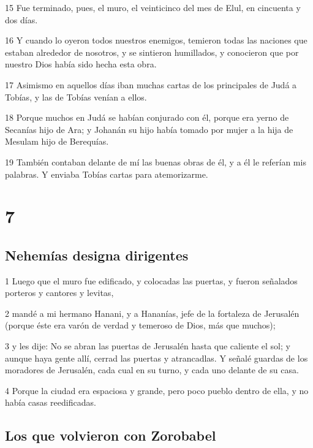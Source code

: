 \par 15 Fue terminado, pues, el muro, el veinticinco del mes de Elul, en cincuenta y dos días.
\par 16 Y cuando lo oyeron todos nuestros enemigos, temieron todas las naciones que estaban alrededor de nosotros, y se sintieron humillados, y conocieron que por nuestro Dios había sido hecha esta obra.
\par 17 Asimismo en aquellos días iban muchas cartas de los principales de Judá a Tobías, y las de Tobías venían a ellos.
\par 18 Porque muchos en Judá se habían conjurado con él, porque era yerno de Secanías hijo de Ara; y Johanán su hijo había tomado por mujer a la hija de Mesulam hijo de Berequías.
\par 19 También contaban delante de mí las buenas obras de él, y a él le referían mis palabras. Y enviaba Tobías cartas para atemorizarme.

\chapter{7}

\section*{Nehemías designa dirigentes}

\par 1 Luego que el muro fue edificado, y colocadas las puertas, y fueron señalados porteros y cantores y levitas,
\par 2 mandé a mi hermano Hanani, y a Hananías, jefe de la fortaleza de Jerusalén (porque éste era varón de verdad y temeroso de Dios, más que muchos);
\par 3 y les dije: No se abran las puertas de Jerusalén hasta que caliente el sol; y aunque haya gente allí, cerrad las puertas y atrancadlas. Y señalé guardas de los moradores de Jerusalén, cada cual en su turno, y cada uno delante de su casa.
\par 4 Porque la ciudad era espaciosa y grande, pero poco pueblo dentro de ella, y no había casas reedificadas.

\section*{Los que volvieron con Zorobabel}

